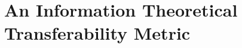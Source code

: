 
\chapter{An Information Theoretical Transferability Metric}\label{ch:transferability}
\cleardoublepage 
